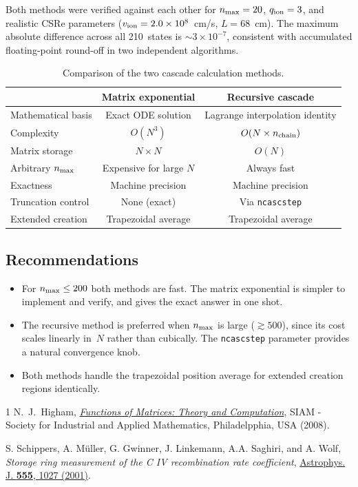 \documentclass[11pt,a4paper]{article}
\begin{document}
Both methods were verified against each other for $n_{\rm max} = 20$,
$q_{\rm ion} = 3$, and realistic CSRe parameters
($v_{\rm ion} = 2.0 \times 10^8$~cm/s, $L = 68$~cm).
The maximum absolute difference across all 210~states is
$\sim 3 \times 10^{-7}$, consistent with accumulated floating-point
round-off in two independent algorithms.

\begin{table}[h]
\centering
\begin{tabular}{lcc}
\toprule
 & Matrix exponential & Recursive cascade \\
\midrule
Mathematical basis & Exact ODE solution & Lagrange interpolation identity \\
Complexity & $O(N^3)$ & $O(N \times n_{\rm chain})$ \\
Matrix storage & $N \times N$ & $O(N)$ \\
Arbitrary $n_{\rm max}$ & Expensive for large $N$ & Always fast \\
Exactness & Machine precision & Machine precision \\
Truncation control & None (exact) & Via \texttt{ncascstep} \\
Extended creation & Trapezoidal average & Trapezoidal average \\
\bottomrule
\end{tabular}
\caption{Comparison of the two cascade calculation methods.}
\label{tab:comparison}
\end{table}

\subsection{Recommendations}

\begin{itemize}
\item For $n_{\rm max} \le 200$ both methods are fast.  The matrix
  exponential is simpler to implement and verify, and gives the exact
  answer in one shot.
\item The recursive method is preferred when $n_{\rm max}$ is large
  ($\gtrsim 500$), since its cost scales linearly in~$N$ rather than
  cubically.  The \texttt{ncascstep} parameter provides a natural
  convergence knob.
\item Both methods handle the trapezoidal position average for extended
  creation regions identically.
\end{itemize}

\begin{thebibliography}{1}
  N.~J.~Higham,
  \href{https://de.scribd.com/document/401677222/Nicholas-J-Higham-Functions-of-Matrices-Theory-BookFi-org-pdf}{\emph{Functions of Matrices: Theory and Computation}}, SIAM - Society for Industrial and Applied Mathematics, Philadelpphia, USA (2008).
  
  
  S. Schippers, A. Müller, G. Gwinner, J. Linkemann, A.A. Saghiri, and A. Wolf, \emph{Storage ring measurement of the C IV recombination rate coefficient}, \href{https://doi.org/10.1086/321512}{Astrophys. J. \textbf{555}, 1027 (2001)}.
\end{thebibliography}
\end{document}
